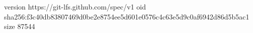 version https://git-lfs.github.com/spec/v1
oid sha256:f3c40db83807469d0be2e8754ee5d601e0576c4c63e5d9c0af6942d86d5b5ac1
size 87544
